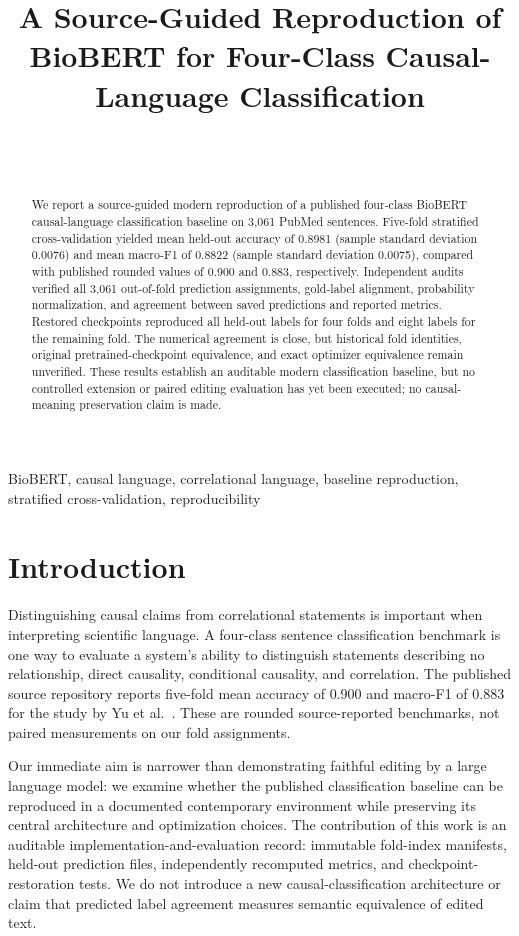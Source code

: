 \documentclass[conference]{IEEEtran}
\title{A Source-Guided Reproduction of BioBERT for Four-Class Causal-Language Classification}
\author{\IEEEauthorblockN{Anand Kumar}\\\IEEEauthorblockA{Indian Institute of Information Technology Allahabad , Prayagraj}\\\IEEEauthorblockA{rsi2026511@iiita.ac.in}}
\begin{document}
\maketitle

\begin{abstract}
We report a source-guided modern reproduction of a published four-class BioBERT causal-language classification baseline on 3,061 PubMed sentences. Five-fold stratified cross-validation yielded mean held-out accuracy of 0.8981 (sample standard deviation 0.0076) and mean macro-F1 of 0.8822 (sample standard deviation 0.0075), compared with published rounded values of 0.900 and 0.883, respectively. Independent audits verified all 3,061 out-of-fold prediction assignments, gold-label alignment, probability normalization, and agreement between saved predictions and reported metrics. Restored checkpoints reproduced all held-out labels for four folds and eight labels for the remaining fold. The numerical agreement is close, but historical fold identities, original pretrained-checkpoint equivalence, and exact optimizer equivalence remain unverified. These results establish an auditable modern classification baseline, but no controlled extension or paired editing evaluation has yet been executed; no causal-meaning preservation claim is made.
\end{abstract}

\begin{IEEEkeywords}
BioBERT, causal language, correlational language, baseline reproduction, stratified cross-validation, reproducibility
\end{IEEEkeywords}

\section{Introduction}\label{sec:intro}
Distinguishing causal claims from correlational statements is important when interpreting scientific language. A four-class sentence classification benchmark is one way to evaluate a system's ability to distinguish statements describing no relationship, direct causality, conditional causality, and correlation. The published source repository reports five-fold mean accuracy of 0.900 and macro-F1 of 0.883 for the study by Yu et al.~\cite{yu2019detecting}. These are rounded source-reported benchmarks, not paired measurements on our fold assignments.

Our immediate aim is narrower than demonstrating faithful editing by a large language model: we examine whether the published classification baseline can be reproduced in a documented contemporary environment while preserving its central architecture and optimization choices. The contribution of this work is an auditable implementation-and-evaluation record: immutable fold-index manifests, held-out prediction files, independently recomputed metrics, and checkpoint-restoration tests. We do not introduce a new causal-classification architecture or claim that predicted label agreement measures semantic equivalence of edited text.
\end{document}
